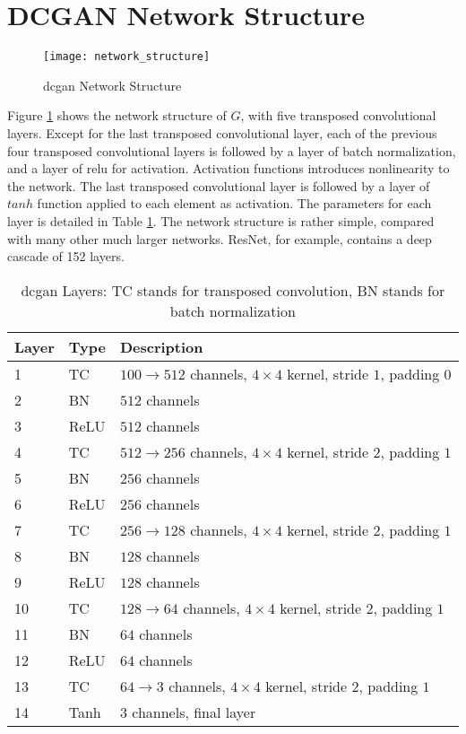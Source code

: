 \section{DCGAN Network Structure}

\begin{figure}[h]
  \centering
  \texttt{[image: network\_structure]}
  \caption{\gls{dcgan} Network Structure}
  \label{fig:network_structure}
\end{figure}

Figure \ref{fig:network_structure} shows the network structure of $G$, with five transposed convolutional
layers. Except for the last transposed convolutional layer, each of the previous four transposed convolutional
layers is followed by a layer of batch normalization, and a layer of \gls{relu} for
activation. Activation functions introduces nonlinearity to the network. The last transposed convolutional
layer is followed by a layer of $tanh$ function applied to each element as activation. The parameters for
each layer is detailed in Table \ref{table:network_layers}.  The network structure is rather simple,
compared with many other much larger networks. ResNet, for example, contains a deep cascade of 152 layers.

\begin{table}[h]
  \centering
  \caption{\gls{dcgan} Layers: TC stands for transposed convolution, BN stands for batch normalization}
  \begin{tabular}{l | l | l }
    \toprule
    Layer & Type & Description \\
    \midrule
    1 & TC & $100 \rightarrow 512$ channels, $4 \times 4$ kernel, stride $1$, padding $0$ \\
    2 & BN & $512$ channels\\
    3 & ReLU & $512$ channels \\
    4 & TC & $512 \rightarrow 256$ channels, $4 \times 4$ kernel, stride $2$, padding $1$ \\
    5 & BN & $256$ channels \\
    6 & ReLU & $256$ channels \\
    7 & TC & $256 \rightarrow 128$ channels, $4 \times 4$ kernel, stride $2$, padding $1$ \\
    8 & BN & $128$ channels \\
    9 & ReLU & $128$ channels \\
    10 & TC & $128 \rightarrow 64$ channels, $4 \times 4$ kernel, stride $2$, padding $1$ \\
    11 & BN & $64$ channels \\
    12 & ReLU & $64$ channels \\
    13 & TC & $64 \rightarrow 3$ channels, $4 \times 4$ kernel, stride $2$, padding $1$ \\
    14 & Tanh & 3 channels, final layer \\
    \bottomrule
  \end{tabular}
  \label{table:network_layers}
\end{table}

